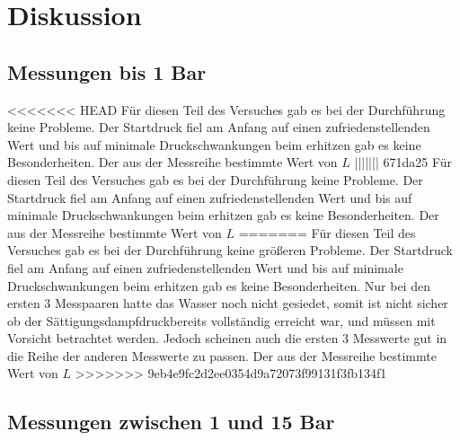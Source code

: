 \section{Diskussion}
\subsection{Messungen bis 1 Bar}

<<<<<<< HEAD
Für diesen Teil des Versuches gab es bei der Durchführung keine Probleme. Der Startdruck fiel am Anfang auf einen 
zufriedenstellenden Wert und bis auf minimale Druckschwankungen beim erhitzen gab es keine Besonderheiten.
Der aus der Messreihe bestimmte Wert von $L$
||||||| 671da25
Für diesen Teil des Versuches gab es bei der Durchführung keine Probleme. Der Startdruck fiel am Anfang auf einen 
zufriedenstellenden Wert und bis auf minimale Druckschwankungen beim erhitzen gab es keine Besonderheiten.
Der aus der Messreihe bestimmte Wert von $L$ 
=======
Für diesen Teil des Versuches gab es bei der Durchführung keine größeren Probleme. Der Startdruck fiel am Anfang auf einen 
zufriedenstellenden Wert und bis auf minimale Druckschwankungen beim erhitzen gab es keine Besonderheiten. Nur bei den ersten
3 Messpaaren hatte das Wasser noch nicht gesiedet, somit ist nicht sicher ob der Sättigungsdampfdruckbereits vollständig erreicht war,
und müssen mit Vorsicht betrachtet werden. Jedoch scheinen auch die ersten 3 Messwerte gut in die Reihe der anderen Messwerte zu passen.
Der aus der Messreihe bestimmte Wert von $L$ 
>>>>>>> 9eb4e9fc2d2ee0354d9a72073f99131f3fb134f1




\subsection{Messungen zwischen 1 und 15 Bar}

